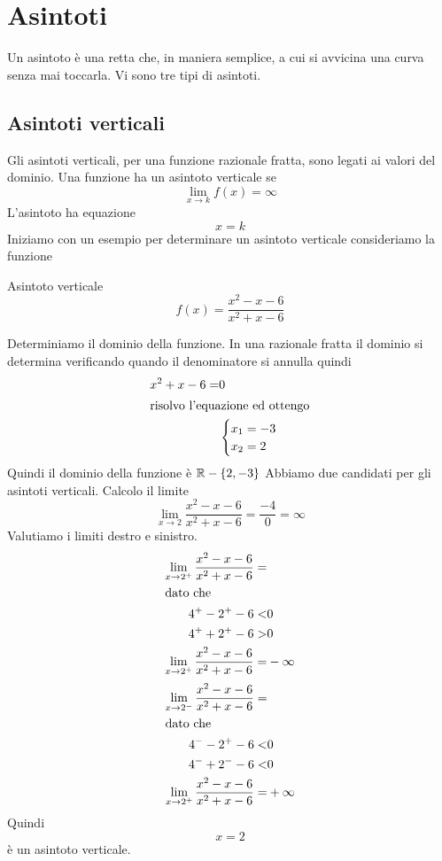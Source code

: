 \chapter{Asintoti}
Un asintoto è una retta che, in maniera semplice, a cui si avvicina una curva senza mai toccarla. Vi sono tre tipi di asintoti. 
\section{Asintoti verticali}
Gli asintoti verticali, per una funzione razionale fratta, sono legati ai valori del dominio.
Una funzione ha un asintoto verticale se 
\[\lim_{x\to k}f(x)=\infty\]
L'asintoto ha equazione \[ x=k\]Iniziamo con un esempio per determinare un asintoto verticale 
consideriamo la funzione 
\begin{esempiot}{Asintoto verticale}{}
\[f(x)=\dfrac{x^2-x-6}{x^2+x-6} \]
\end{esempiot}
Determiniamo il dominio
della funzione. In una razionale fratta il dominio si determina verificando quando il denominatore si annulla quindi
\begin{align*}
x^2+x-6=&0\\
\intertext{risolvo l'equazione ed ottengo}
&\begin{cases}
x_1=-3\\
x_2=2
\end{cases}
\end{align*}
Quindi il dominio della funzione è $\mathbb{R}-\lbrace2,-3\rbrace$ Abbiamo due candidati per gli asintoti verticali.
Calcolo il limite \[ \lim_{x\to 2}\dfrac{x^2-x-6}{x^2+x-6}=\dfrac{-4}{0}=\infty\] Valutiamo i limiti destro e sinistro. 
\begin{align*}
\lim_{x\to 2^+}\dfrac{x^2-x-6}{x^2+x-6}=&\\
\intertext{dato che}
4^+-2^+-6<&0\\
4^++2^+-6>&0\\
\lim_{x\to 2^+}\dfrac{x^2-x-6}{x^2+x-6}=&-\infty\\
\end{align*}
\begin{align*}
\lim_{x\to 2^-}\dfrac{x^2-x-6}{x^2+x-6}=&\\
\intertext{dato che}
4^--2^+-6<&0\\
4^-+2^--6<&0\\
\lim_{x\to 2^+}\dfrac{x^2-x-6}{x^2+x-6}=&+\infty\\
\end{align*}
Quindi \[x=2\] è un asintoto verticale.
